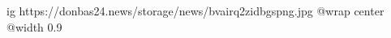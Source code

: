 
 
 
 
 

\ifcmt
  ig https://donbas24.news/storage/news/bvairq2zidbgspng.jpg
  @wrap center
  @width 0.9
\fi

